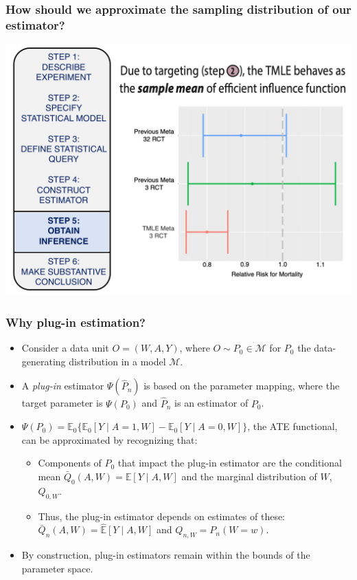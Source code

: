 \documentclass[t]{beamer}
\begin{document}
\begin{frame}
  \frametitle{How should we approximate the sampling distribution of our estimator?}
  \vspace{-20pt}
  \begin{center}
  \includegraphics[width = 1.05\textwidth]{figures/roadmap5.pdf}
  \end{center}
\end{frame}

\begin{frame}
  \frametitle{Why plug-in estimation?}
  \begin{itemize}
    \item Consider a data unit $O = (W, A, Y)$, where $O \sim P_0 \in
      \mathcal{M}$ for $P_0$ the data-generating distribution in a model
      $\mathcal{M}$.
    \item A \textit{plug-in} estimator $\Psi(\hat{P}_n)$ is based on the
      parameter mapping, where the target parameter is $\Psi(P_0)$ and
      $\hat{P}_n$ is an estimator of $P_0$.
    \item $\Psi(P_0) = \mathbb{E}_0\{\mathbb{E}_0[Y \mid A = 1, W] -
      \mathbb{E}_0[Y \mid A = 0, W]\}$, the ATE functional, can be approximated
      by recognizing that:
      \begin{itemize}
        \item Components of $P_0$ that impact the plug-in estimator are the
          conditional mean $\bar{Q}_0(A,W) = \mathbb{E}[Y \mid A, W]$ and the
          marginal distribution of $W$, $Q_{0,W}$.
        \item Thus, the plug-in estimator depends on estimates of these:
          $\bar{Q}_n(A,W) = \hat{\mathbb{E}}[Y \mid A, W]$ and $Q_{n,W} =
          P_n(W = w)$.
      \end{itemize}
    \item By construction, plug-in estimators remain within the bounds of the
      parameter space.
  \end{itemize}
\end{frame}
\end{document}
